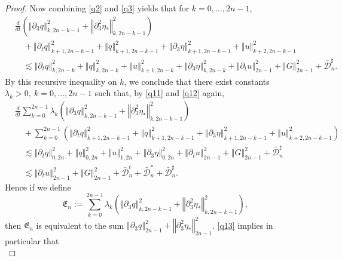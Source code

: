 \documentclass[a4paper,reqno,11pt]{amsart}
\numberwithin{equation}{section}
\providecommand{\norm}[1]{\left\Vert#1\right\Vert}
\providecommand{\norm}[1]{\left\Vert#1\right\Vert}
\begin{document}
\begin{proof}
Now combining \eqref{q2} and \eqref{q3} yields that for $k=0,\dots, 2n-1$,
\begin{equation}
\begin{split}
& \frac{d}{dt} \left(  \norm{ {\partial}_3    {q} }_{k,2n-k-1}^2+ \norm{  {\partial}_3^2   \eta_\ast }_{k,2n-k-1}^2 \right)
\\&\quad+\norm{ {\partial_t} q }_{k+1,2n-k-1}^2+\norm{  q }_{k+1,2n-k-1}^2+  \norm{  {\partial}_3   \eta  }_{k+1,2n-k-1}^2
 + \norm{   u  }_{k+2,2n-k-1}^2
\\&\quad{\lesssim}  \norm{ {\partial_t} q }_{k,2n-k}^2+\norm{  q }_{k,2n-k}^2+  \norm{   u  }_{k+1,2n-k}^2+\norm{   {\partial}_3\eta  }_{k,2n-k}^2 +\norm{{\partial}_t  u  }_{2n-1}^2
+\norm{G}_{2n-1}^2+ \bar{\mathcal{D}}_n^\sharp.
\end{split}
\end{equation}
By this recursive inequality on $k$, we conclude that there exist constants $\lambda_k>0,\ k=0,\dots, 2n-1$ such that, by \eqref{q11} and \eqref{q12} again,
 \begin{equation}\label{q13}
\begin{split}
& \frac{d}{dt} \sum_{k=0}^{2n-1}\lambda_k\left(   \norm{ {\partial}_3    {q} }_{k,2n-k-1}^2+ \norm{  {\partial}_3^2   \eta_\ast }_{k,2n-k-1}^2 \right)
\\&\quad+\sum_{k=0}^{2n-1}\left(\norm{ {\partial_t} q }_{k+1,2n-k-1}^2+ \norm{  q }_{k+1,2n-k-1}^2
  +   \norm{  {\partial}_3   \eta  }_{k+1,2n-k-1}^2+  \norm{   u  }_{k+2,2n-k-1}^2\right)
\\&\quad{\lesssim}  \norm{ {\partial_t} q }_{0,2n}^2+\norm{  q }_{0,2n}^2+  \norm{   u  }_{1,2n}^2+\norm{   {\partial}_3\eta  }_{0,2n}^2 +\norm{{\partial}_t  u  }_{2n-1}^2
+\norm{G}_{2n-1}^2+\bar{\mathcal{D}}_n^\sharp
\\&\quad{\lesssim}  \norm{{\partial}_t  u  }_{2n-1}^2
+\norm{G}_{2n-1}^2+\bar{\mathcal{D}}_n^t+\bar{\mathcal{D}}_n^\ast+\bar{\mathcal{D}}_n^\sharp.
\end{split}
\end{equation}
Hence if we define
\begin{equation}
\mathfrak{E}_n:=\sum_{k=0}^{2n-1}\lambda_k\left( \norm{ {\partial}_3    {q} }_{k,2n-k-1}^2+ \norm{  {\partial}_3^2   \eta_\ast }_{k,2n-k-1}^2 \right),
\end{equation}
then $\mathfrak{E}_n$ is equivalent to the sum $\norm{ {\partial}_3    {q} }_{2n-1}^2+ \norm{  {\partial}_3^2   \eta_\ast }_{2n-1}^2 $. \eqref{q13} implies in particular that
 \begin{equation}

\end{equation}
\end{proof}
\end{document}
